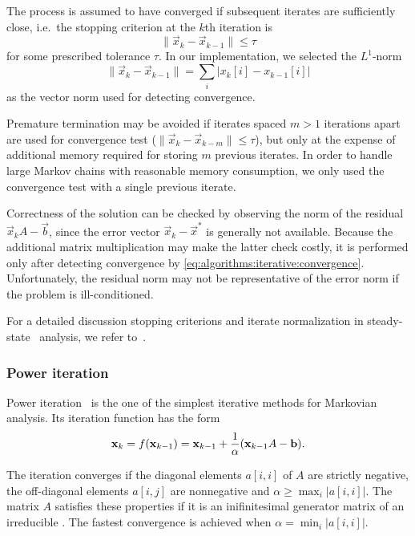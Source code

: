 The process is assumed to have converged if subsequent iterates are
sufficiently close, i.e.~the stopping criterion at the $k$th iteration
is
\begin{equation}
  \label{eq:algorithms:iterative:convergence}
  \| \vec{x}_{k} - \vec{x}_{k - 1} \| \le \tau
\end{equation}
for some prescribed tolerance $\tau$. In our implementation, we
selected the $L^1$-norm
\begin{equation}
  \| \vec{x}_{k} - \vec{x}_{k - 1} \| = \sum_{i} \bigl\lvert x_{k}[i] - x_{k -
    1}[i] \bigr\rvert
\end{equation}
as the vector norm used for detecting convergence.

Premature termination may be avoided if iterates spaced $m > 1$
iterations apart are used for convergence test
($\| \vec{x}_k - \vec{x}_{k - m} \| \le \tau$), but only at the
expense of additional memory required for storing $m$ previous
iterates. In order to handle large Markov chains with reasonable
memory consumption, we only used the convergence test with a single
previous iterate.

Correctness of the solution can be checked by observing the norm of
the residual $\vec{x}_{k} A - \vec{b}$, since the error vector
$\vec{x}_k - \vec{x}^*$ is generally not available. Because the
additional matrix multiplication may make the latter check costly, it
is performed only after detecting convergence by
\vref{eq:algorithms:iterative:convergence}. Unfortunately, the
residual norm may not be representative of the error norm if the
problem is ill-conditioned.

For a detailed discussion stopping criterions and iterate
normalization in steady-state \CTMC\ analysis, we refer
to~\citep[Section~10.3.5]{stewart2009probability}.

\subsubsection{Power iteration}

Power iteration~\citep[Section~10.3.1]{stewart2009probability} is the
one of the simplest iterative methods for Markovian analysis. Its
iteration function has the form
\begin{equation}
  \vec{x}_k = f(\vec{x}_{k - 1}) = \vec{x}_{k - 1} + \frac{1}{\alpha} \mleft(
  \vec{x}_{k - 1} A - \vec{b} \mright) \text.
\end{equation}

The iteration converges if the diagonal elements $a[i,i]$ of $A$ are
strictly negative, the off-diagonal elements $a[i,j]$ are nonnegative
and $\alpha \ge \max_{i} \lvert a[i,i] \rvert$. The matrix $A$
satisfies these properties if it is an inifinitesimal generator matrix
of an irreducible \CTMC. The fastest convergence is achieved when
$\alpha = \min_{i} \lvert a[i,i] \rvert$.

